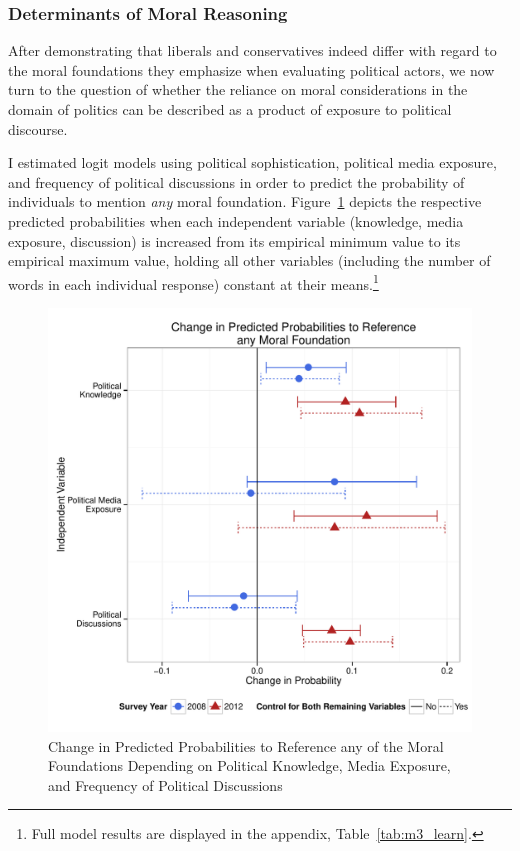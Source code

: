 \documentclass[12pt]{article}
\begin{document}
\subsubsection{Determinants of Moral Reasoning}

After demonstrating that liberals and conservatives indeed differ with regard to the moral foundations they emphasize when evaluating political actors, we now turn to the question of whether the reliance on moral considerations in the domain of politics can be described as a product of exposure to political discourse.

I estimated logit models using political sophistication, political media exposure, and frequency of political discussions in order to predict the probability of individuals to mention \textit{any} moral foundation. Figure~\ref{fig:m3_learn} depicts the respective predicted probabilities when each independent variable (knowledge, media exposure, discussion) is increased from its empirical minimum value to its empirical maximum value, holding all other variables (including the number of words in each individual response) constant at their means.\footnote{Full model results are displayed in the appendix, Table~\ref{tab:m3_learn}.}

\begin{figure}\centering
\includegraphics[scale=.5]{../calc/fig/m3_learn.pdf}
\caption{Change in Predicted Probabilities to Reference any of the Moral Foundations Depending on Political Knowledge, Media Exposure, and Frequency of Political Discussions}\label{fig:m3_learn}
\end{figure}
\end{document}

